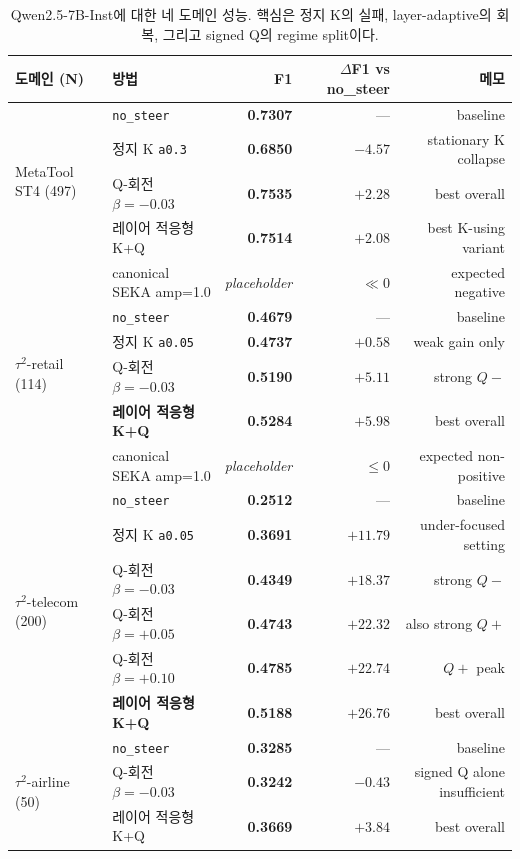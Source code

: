 \begin{table}[t]
\centering
\caption{Qwen2.5-7B-Inst에 대한 네 도메인 성능. 핵심은 정지 K의 실패, layer-adaptive의 회복, 그리고 signed Q의 regime split이다.}
\label{tab:main}
\small
\begin{tabularx}{\linewidth}{@{}lXrrr@{}}
\toprule
도메인 (N) & 방법 & F1 & $\Delta$F1 vs no\_steer & 메모 \\
\midrule
\multirow{4}{*}{MetaTool ST4 (497)}
 & \texttt{no\_steer} & \textbf{0.7307} & --- & baseline \\
 & 정지 K \texttt{a0.3} & \textbf{0.6850} & $\mathbf{-4.57}$ & stationary K collapse \\
 & Q-회전 $\beta=-0.03$ & \textbf{0.7535} & $\mathbf{+2.28}$ & best overall \\
 & 레이어 적응형 K+Q & \textbf{0.7514} & $\mathbf{+2.08}$ & best K-using variant \\
 & canonical SEKA amp=1.0 & \emph{placeholder} & $\ll 0$ & expected negative \\
\midrule
\multirow{4}{*}{$\tau^2$-retail (114)}
 & \texttt{no\_steer} & \textbf{0.4679} & --- & baseline \\
 & 정지 K \texttt{a0.05} & \textbf{0.4737} & $+0.58$ & weak gain only \\
 & Q-회전 $\beta=-0.03$ & \textbf{0.5190} & $+5.11$ & strong $Q-$ \\
 & \textbf{레이어 적응형 K+Q} & \textbf{0.5284} & $\boldsymbol{+5.98}$ & best overall \\
 & canonical SEKA amp=1.0 & \emph{placeholder} & $\le 0$ & expected non-positive \\
\midrule
\multirow{6}{*}{$\tau^2$-telecom (200)}
 & \texttt{no\_steer} & \textbf{0.2512} & --- & baseline \\
 & 정지 K \texttt{a0.05} & \textbf{0.3691} & $+11.79$ & under-focused setting \\
 & Q-회전 $\beta=-0.03$ & \textbf{0.4349} & $+18.37$ & strong $Q-$ \\
 & Q-회전 $\beta=+0.05$ & \textbf{0.4743} & $+22.32$ & also strong $Q+$ \\
 & Q-회전 $\beta=+0.10$ & \textbf{0.4785} & $+22.74$ & $Q+$ peak \\
 & \textbf{레이어 적응형 K+Q} & \textbf{0.5188} & $\boldsymbol{+26.76}$ & best overall \\
\midrule
\multirow{4}{*}{$\tau^2$-airline (50)}
 & \texttt{no\_steer} & \textbf{0.3285} & --- & baseline \\
 & Q-회전 $\beta=-0.03$ & \textbf{0.3242} & $-0.43$ & signed Q alone insufficient \\
 & 레이어 적응형 K+Q & \textbf{0.3669} & $\mathbf{+3.84}$ & best overall \\
\bottomrule
\end{tabularx}
\end{table}


